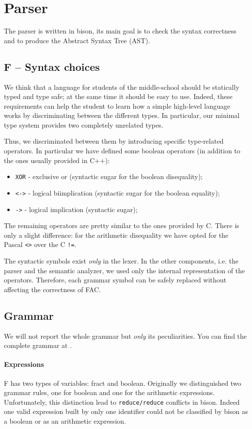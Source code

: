 \section{Parser}
\label{sec:parser}
The parser is written in bison, its main goal is to check the
syntax correctness and to produce the Abstract Syntax Tree (AST).

\subsection{F -- Syntax choices}
We think that a language for students of the middle-school should be
statically typed and type safe; at the same time it should be easy to use.
Indeed, these requirements can help the student to learn how a simple
high-level language works by discriminating between the different types.
In particular, our minimal type system provides two completely unrelated types.


Thus, we discriminated between them by introducing specific type-related
operators. In particular we have defined some boolean operators
(in addition to the ones usually provided in C++):
\begin{itemize}
	\item \verb|XOR| - exclusive or (syntactic sugar for the boolean disequality);
	\item \verb|<->| - logical biimplication (syntactic sugar for the boolean 
	equality);
	\item \verb|->| - logical implication (syntactic sugar);
\end{itemize}

The remaining operators are pretty similar to the ones provided by C.
There is only a slight difference: for the arithmetic disequality we have opted
for the Pascal \verb|<>| over the C \verb|!=|.

The syntactic symbols exist \emph{only} in the lexer. In the
other components, i.e. the parser and the semantic analyzer, we used
only the internal representation of the operators. Therefore, each grammar
symbol can be safely replaced without affecting the correctness of FAC.

\subsection{Grammar}
We will not report the whole grammar but \emph{only} its peculiarities.
You can find the complete grammar at .

\paragraph{Expressions}
F has two types of variables: fract and boolean.
Originally we distinguished two grammar rules, one for boolean and
one for the arithmetic expressions. Unfortunately, this distinction
lead to \verb|reduce/reduce| conflicts in bison.
Indeed one valid expression built by only one identifier could not be
classified by bison as a boolean or as an arithmetic expression.


